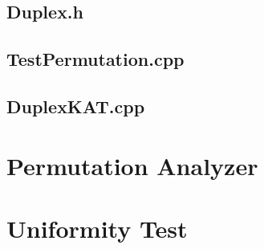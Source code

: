 %

\subsection{Duplex.h}


\subsection{TestPermutation.cpp}


\subsection{DuplexKAT.cpp}


\section{Permutation Analyzer}


\section{\pval Uniformity Test}
\label{sec:UniformityTestCode}


